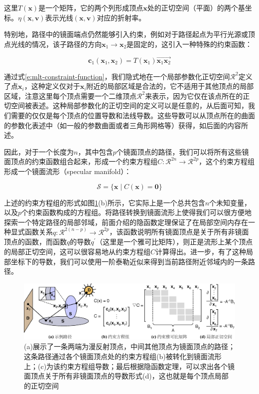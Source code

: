 \noindent 这里$T(\mathbf{x})$是一个矩阵，它的两个列形成顶点$\mathbf{x}$处的正切空间（平面）的两个基坐标。$\eta(\mathbf{x},\mathbf{v})$表示光线$(\mathbf{x},\mathbf{v})$对应的折射率。

特别地，路径中的镜面端点仍然能够引入约束，例如对于路径起点为平行光源或顶点光线的情况，该子路径的方向$\mathbf{x}_1\to\mathbf{x}_2$是固定的，这引入一种特殊的约束函数：

\begin{equation}
	\mathbf{c}_1(\mathbf{x}_1,\mathbf{x}_2)=T(\mathbf{x}_1)\overrightarrow{\mathbf{x}_1\mathbf{x}_2}
\end{equation}

通过式\ref{e:mlt-constraint-function}，我们隐式地在一个局部参数化正切空间$\mathcal{R}^{2}$定义了点$\mathbf{x}_i$，这种定义仅对于$\mathbf{x}_i$附近的局部区域是合法的，它不适用于其他顶点的局部区域，注意这里每个顶点需要一个二维顶点$\mathcal{R}^{2}$来表示，因为它仅在该点所在的正切空间被表述。这种局部参数化的正切空间的定义可以是任意的，从后面可知，我们需要的仅仅是每个顶点的位置导数和法线导数。这些导数可以从顶点所在的曲面的参数化表述中（如一般的参数曲面或者三角形网格等）获得，如后面的内容所述。

因此，对于一个长度为$n$，其中包含$p$个镜面顶点的路径，我们可以将所有这些镜面顶点的约束函数组合起来，形成一个约束方程组$C:\mathcal{R}^{2n}\to\mathcal{R}^{2p}$，这个约束方程组形成一个镜面流形（specular manifold）：

\begin{equation}\label{e:mlt-manifold}
	\mathcal{S}=\{{\mathbf{x}}\mid C({\mathbf{x}})=\mathbf{0}\}
\end{equation}

上述的约束方程组的形式如图\ref{f:mlt-manifold-constraint}(b)所示，它实际上是一个总共包含$n$个未知变量，以及$p$个约束函数构成的方程组。将路径转换到镜面流形上使得我们可以很方便地探索一个特定路径的局部邻域，前面介绍的隐函数定理保证了在局部空间内存在一种显式函数关系$q:\mathcal{R}^{2(n-p)}\to\mathcal{R}^{2p}$，该函数说明所有镜面顶点是关于所有非镜面顶点的函数，而函数$q$的导数$q^{'}$（这里是一个雅可比矩阵），则正是流形上某个顶点的局部正切空间，这可以很容易地从约束方程组$C$计算得出。进一步，有了这种局部坐标下的导数，我们可以使用一阶泰勒近似来得到当前路径附近邻域内的一条路径。

\begin{figure}
\begin{fullwidth}
	\includegraphics[width=1.0\thewidth]{figures/mlt/manifold-constraint}
	\caption{(a)展示了一条两端为漫反射顶点，中间其他顶点为镜面顶点的路径；这条路径通过各个镜面顶点处的约束方程组(b)被转化到镜面流形上；(c)为该约束方程组导数；最后根据隐函数定理，可以求出各个镜面顶点关于所有非镜面顶点的导数形式(d)，这也就是每个顶点局部的正切空间}
	\label{f:mlt-manifold-constraint}
\end{fullwidth}
\end{figure}

